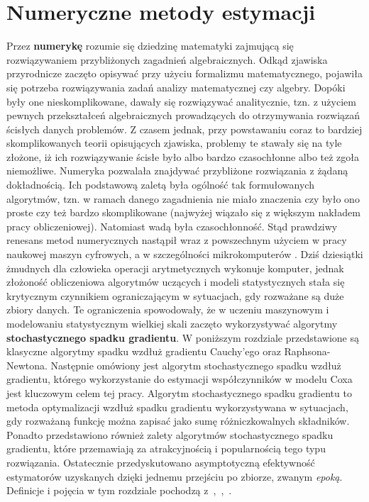 \chapter{Numeryczne metody estymacji}

Przez \textbf{numerykę} rozumie się dziedzinę matematyki
zajmującą się rozwiązywaniem przybliżonych zagadnień algebraicznych. Odkąd zjawiska przyrodnicze zaczęto opisywać przy użyciu formalizmu matematycznego,
pojawiła się potrzeba rozwiązywania zadań analizy matematycznej czy algebry. Dopóki były
one nieskomplikowane, dawały się rozwiązywać analitycznie, tzn. z użyciem pewnych
przekształceń algebraicznych prowadzących do otrzymywania rozwiązań ścisłych danych
problemów. Z czasem jednak, przy powstawaniu coraz to bardziej skomplikowanych teorii
opisujących zjawiska, problemy te stawały się na tyle złożone, iż ich rozwiązywanie ścisłe
było albo bardzo czasochłonne albo też zgoła niemożliwe. Numeryka pozwalała znajdywać
przybliżone rozwiązania z żądaną dokładnością. Ich podstawową zaletą była ogólność tak
formułowanych algorytmów, tzn. w ramach danego zagadnienia nie miało znaczenia czy było
ono proste czy też bardzo skomplikowane (najwyżej wiązało się z większym nakładem pracy
obliczeniowej). Natomiast wadą była czasochłonność. Stąd prawdziwy renesans metod
numerycznych nastąpił wraz z powszechnym użyciem w pracy naukowej maszyn cyfrowych,
a w szczególności mikrokomputerów \cite{milewski}. Dziś dziesiątki żmudnych dla człowieka operacji
arytmetycznych wykonuje komputer, jednak złożoność obliczeniowa algorytmów uczących i modeli statystycznych stała się krytycznym czynnikiem ograniczającym w sytuacjach, gdy rozważane są duże zbiory danych. Te ograniczenia spowodowały, że w uczeniu maszynowym i modelowaniu statystycznym wielkiej skali zaczęto wykorzystywać algorytmy \textbf{stochastycznego spadku gradientu}. W poniższym rozdziale przedstawione są klasyczne algorytmy spadku wzdłuż gradientu Cauchy'ego oraz Raphsona-Newtona. Następnie omówiony jest algorytm stochastycznego spadku wzdłuż gradientu, którego wykorzystanie do estymacji współczynników w modelu Coxa jest kluczowym celem tej pracy. Algorytm stochastycznego spadku gradientu to metoda optymalizacji wzdłuż spadku gradientu wykorzystywana w sytuacjach, gdy rozważaną funkcję można zapisać jako sumę różniczkowalnych składników. Ponadto przedstawiono również zalety algorytmów stochastycznego spadku gradientu, które przemawiają za atrakcyjnością i popularnością tego typu rozwiązania. Ostatecznie przedyskutowano asymptotyczną efektywność estymatorów uzyskanych dzięki jednemu przejściu po zbiorze, zwanym \textit{epoką}. Definicje i pojęcia w tym rozdziale pochodzą z~\cite{bott1},~\cite{bott2},~\cite{kotlowski}.

